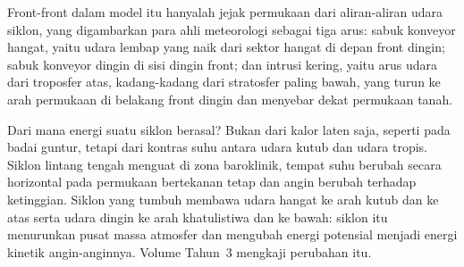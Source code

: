 \begin{omfigure}
\par{}
\end{omfigure}

Front-front dalam model itu hanyalah jejak permukaan dari aliran-aliran udara siklon, yang
digambarkan para ahli meteorologi sebagai tiga arus: sabuk konveyor hangat, yaitu udara lembap yang naik dari
sektor hangat di depan front dingin; sabuk konveyor dingin di sisi dingin front; dan
intrusi kering, yaitu arus udara dari troposfer atas, kadang-kadang dari stratosfer paling bawah,
yang turun ke arah permukaan di belakang front dingin dan menyebar dekat
permukaan tanah.

Dari mana energi suatu siklon berasal? Bukan dari kalor laten saja, seperti pada badai guntur,
tetapi dari kontras suhu antara udara kutub dan udara tropis. Siklon lintang tengah
menguat di zona baroklinik, tempat suhu berubah secara horizontal pada permukaan bertekanan
tetap dan angin berubah terhadap ketinggian. Siklon yang tumbuh membawa udara hangat ke arah kutub
dan ke atas serta udara dingin ke arah khatulistiwa dan ke bawah: siklon itu menurunkan pusat massa
atmosfer dan mengubah energi potensial menjadi energi kinetik angin-anginnya. Volume Tahun~3
mengkaji perubahan itu.

